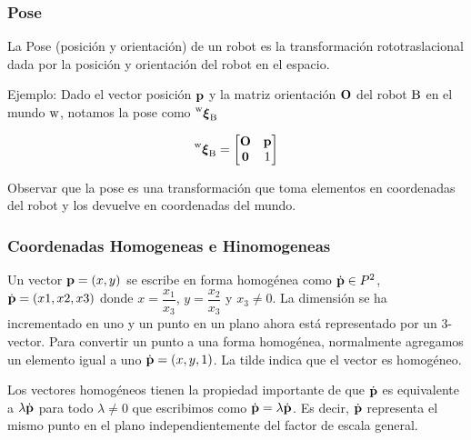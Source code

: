\begin{frame}
	\frametitle{Pose}
	
	La Pose (posición y orientación) de un robot es la transformación rototraslacional dada por la posición y orientación del robot en el espacio.
	
	Ejemplo: Dado el vector posición $\boldsymbol{\mathbf{p}}$ y la matriz orientación $\boldsymbol{\mathbf{O}}$ del robot $\mathrm{B}$ en el mundo $\mathrm{w}$, notamos la pose como $\prescript{\mathrm{\mathrm{w}}}{}{{\boldsymbol{\mathbf{\xi}}}_\mathrm{\mathrm{B}}}$
	
	\begin{equation*}
		\prescript{\mathrm{\mathrm{w}}}{}{{\boldsymbol{\mathbf{\xi}}}_\mathrm{\mathrm{B}}}=
		\begin{bmatrix}
			\boldsymbol{\mathbf{O}} & \boldsymbol{\mathbf{p}}\\
			\boldsymbol{\mathbf{0}} & 1
		\end{bmatrix}
	\end{equation*}

	Observar que la pose es una transformación que toma elementos en coordenadas del robot y los devuelve en coordenadas del mundo.
\end{frame}


\begin{frame}
    \frametitle{Coordenadas Homogeneas e Hinomogeneas}
    Un vector $\boldsymbol{\mathbf{p}} = (x, y)$ se escribe en forma homogénea como $\dot{\boldsymbol{\mathbf{p}}} \in P^2$, $\dot{\boldsymbol{\mathbf{p}}} = (x1, x2, x3)$ donde $x = \dfrac{x_1}{x_3}$, $y= \dfrac{x_2}{x_3}$ y $x_3 \neq 0$. La dimensión se ha incrementado en uno y un punto en un plano ahora está representado por un 3-vector. Para convertir un punto a una forma homogénea, normalmente agregamos un elemento igual a uno $\dot{\boldsymbol{\mathbf{p}}} = (x, y, 1)$. La tilde indica que el vector es homogéneo.


    Los vectores homogéneos tienen la propiedad importante de que $\dot{\boldsymbol{\mathbf{p}}}$ es equivalente a $\lambda \dot{\boldsymbol{\mathbf{p}}}$ para todo $\lambda \neq 0$ que escribimos como $\dot{\boldsymbol{\mathbf{p}}} = \lambda \dot{\boldsymbol{\mathbf{p}}}$. Es decir, $\dot{\boldsymbol{\mathbf{p}}}$ representa el mismo punto en el plano independientemente del factor de escala general.
\end{frame}

